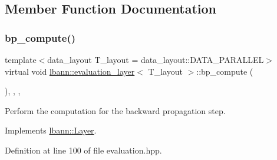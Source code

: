 \subsection{Member Function Documentation}
\mbox{\label{classlbann_1_1evaluation__layer_a7b2b0898c0b0a29e35ec14f766758551}} 
\subsubsection{\texorpdfstring{bp\+\_\+compute()}{bp\_compute()}}
{\footnotesize\ttfamily template$<$data\+\_\+layout T\+\_\+layout = data\+\_\+layout\+::\+D\+A\+T\+A\+\_\+\+P\+A\+R\+A\+L\+L\+EL$>$ \\
virtual void \hyperlink{classlbann_1_1evaluation__layer}{lbann\+::evaluation\+\_\+layer}$<$ T\+\_\+layout $>$\+::bp\+\_\+compute (\begin{DoxyParamCaption}{ }\end{DoxyParamCaption})\hspace{0.3cm}{\ttfamily [inline]}, {\ttfamily [override]}, {\ttfamily [protected]}, {\ttfamily [virtual]}}

Perform the computation for the backward propagation step. 

Implements \hyperlink{classlbann_1_1Layer_a7442e01f9ee1294df2de811efcf5171e}{lbann\+::\+Layer}.



Definition at line 100 of file evaluation.\+hpp.


